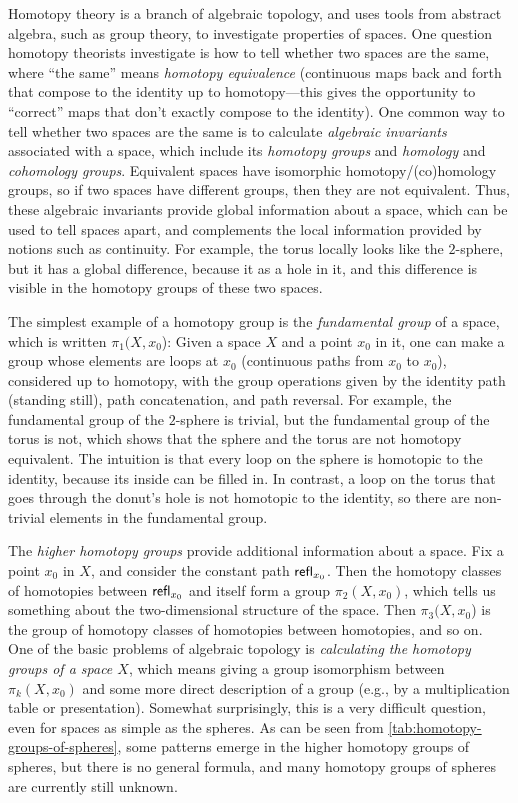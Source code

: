 %
Homotopy theory is a branch of algebraic topology, and uses tools from abstract algebra,
such as group theory, to investigate properties of spaces.  One question
homotopy theorists investigate is how to tell whether two spaces are the
same, where ``the same'' means \emph{homotopy equivalence}
%
(continuous
maps back and forth that compose to the identity up to homotopy---this
gives the opportunity to ``correct'' maps that don't exactly compose to
the identity).  One common way to tell whether two spaces are the same
is to calculate \emph{algebraic invariants} associated with a space,
which include its \emph{homotopy groups} and \emph{homology} and
\emph{cohomology groups}.
%
%
Equivalent spaces have isomorphic
homotopy/(co)homology groups, so if two spaces have different groups,
then they are not equivalent.  Thus, these algebraic invariants provide
global information about a space, which can be used to tell spaces
apart, and complements the local information provided by notions such as
continuity.  For example, the torus locally looks like the $2$-sphere, but it
has a global difference, because it as a hole in it, and this difference
is visible in the homotopy groups of these two spaces.

The simplest example of a homotopy group is the \emph{fundamental group}
%
of a space, which is written $\pi_1(X,x_0$): Given a space $X$ and a
point $x_0$ in it, one can make a group whose elements are loops at
$x_0$ (continuous paths from $x_0$ to $x_0$), considered up to homotopy, with the
group operations given by the identity path (standing still), path
concatenation, and path reversal.  For example, the fundamental group of
the $2$-sphere is trivial, but the fundamental group of the torus is not,
which shows that the sphere and the torus are not homotopy equivalent.
The intuition is that every loop on the sphere is homotopic to the
identity, because its inside can be filled in.  In contrast, a loop on
the torus that goes through the donut's hole is not homotopic to the
identity, so there are non-trivial elements in the fundamental group.

The \emph{higher homotopy groups} provide additional information about a
space.  Fix a point $x_0$ in $X$, and consider the constant path
$\mathsf{refl}_{x_0}$.  Then the homotopy classes of homotopies between $\mathsf{refl}_{x_0}$
and itself form a group $\pi_2(X,x_0)$, which tells us something about
the two-dimensional structure of the space.  Then $\pi_3(X,x_0$) is the
group of homotopy classes of homotopies between homotopies, and so on.
One of the basic problems of algebraic topology  is
\emph{calculating the homotopy groups of a space $X$}, which means
giving a group isomorphism between $\pi_k(X,x_0)$ and some more direct
description of a group (e.g., by a multiplication table or
presentation).  Somewhat surprisingly, this is a very difficult
question, even for spaces as simple as the spheres.  As can be seen from
\cref{tab:homotopy-groups-of-spheres}, some patterns emerge in the
higher homotopy groups of spheres, but there is no general formula, and
many homotopy groups of spheres are currently still unknown.

